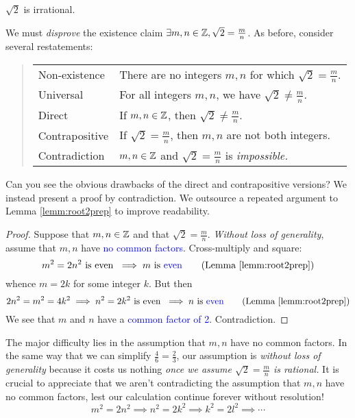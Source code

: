 \begin{thm}{}{}
	$\sqrt 2$ is irrational.
\end{thm}

We must \emph{disprove} the existence claim $\exists m,n\in\mathbb{Z}, \sqrt 2=\frac mn$.
As before, consider several restatements:\vspace{-5pt}
\begin{quote}
	\begin{tabular}{@{}ll}
		Non-existence& There are no integers $m,n$ for which $\sqrt 2=\frac mn$.\\
		Universal&For all integers $m,n$, we have $\sqrt 2\neq \frac mn$.\\
		Direct&If $m,n\in\mathbb{Z}$, then $\sqrt 2\neq\frac mn$.\\
		Contrapositive&If $\sqrt 2=\frac mn$, then $m,n$ are not both integers.\\
		Contradiction&$m,n\in\mathbb{Z}$ and $\sqrt 2=\frac mn$ is \emph{impossible.}
	\end{tabular}
\end{quote}

Can you see the obvious drawbacks of the direct and contrapositive versions?
We instead present a proof by contradiction. We outsource a repeated argument to Lemma \ref{lemm:root2prep} to improve readability.

\begin{proof}
	Suppose that $m,n\in\mathbb{Z}$ and that $\sqrt 2=\frac mn$. \emph{Without loss of generality}, assume that $m,n$ have \textcolor{blue}{no common factors}. Cross-multiply and square:
	\[
		m^2=2n^2\text{ is even }\implies m\text{ is \textcolor{blue}{even}} \tag{Lemma \ref{lemm:root2prep}}
	\]
	whence $m=2k$ for some integer $k$. But then
	\[
		2n^2=m^2=4k^2\implies n^2=2k^2\text{ is even }\implies n\text{ is \textcolor{blue}{even}} \tag{Lemma \ref{lemm:root2prep}}
	\]
	We see that $m$ and $n$ have a \textcolor{blue}{common factor of 2}. Contradiction.
\end{proof}


The major difficulty lies in the assumption that $m,n$ have no common factors. In the same way that we can simplify $\frac 46=\frac 23$, our assumption is \emph{without loss of generality} because it costs us nothing \emph{once we assume $\sqrt 2=\frac mn$ is rational.} It is crucial to appreciate that we aren't contradicting the assumption that $m,n$ have no common factors, lest our calculation continue forever without resolution!
\[
	m^2=2n^2\implies n^2=2k^2\implies k^2=2l^2\implies\cdots
\]


